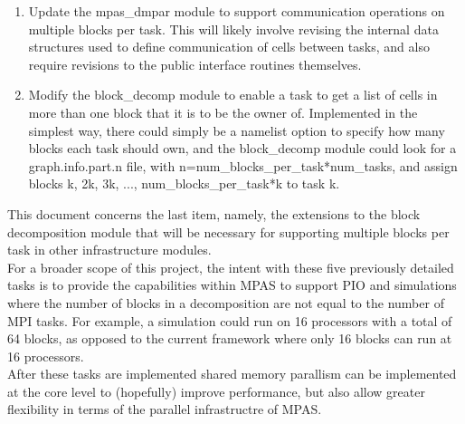 \documentclass[11pt]{report}
\begin{document}
\begin{enumerate}
\item Update the mpas\_dmpar module to support communication operations on                              
   multiple blocks per task. This will likely involve revising the                                  
   internal data structures used to define communication of cells                                   
   between tasks, and also require revisions to the public interface                                
   routines themselves.                                                                             
                                                                                                    
\item Modify the block\_decomp module to enable a task to get a list of                                 
   cells in more than one block that it is to be the owner of.                                      
   Implemented in the simplest way, there could simply be a namelist                                
   option to specify how many blocks each task should own, and the                                  
   block\_decomp module could look for a graph.info.part.n file, with                                
   n=num\_blocks\_per\_task*num\_tasks, and assign blocks k, 2k, 3k, ...,                               
   num\_blocks\_per\_task*k to task k.    

\end{enumerate}                                                             
                                                                                                    
This document concerns the last item, namely, the extensions to the block decomposition
module that will be necessary for supporting multiple blocks per task in other infrastructure
modules. \\

For a broader scope of this project, the intent with these five previously
detailed tasks is to provide the capabilities within MPAS to support PIO and
simulations where the number of blocks in a decomposition are not equal to the
number of MPI tasks. For example, a simulation could run on 16 processors with
a total of 64 blocks, as opposed to the current framework where only 16 blocks
can run at 16 processors. \\

After these tasks are implemented shared memory parallism can be implemented at
the core level to (hopefully) improve performance, but also allow greater
flexibility in terms of the parallel infrastructre of MPAS. \\
\end{document}
